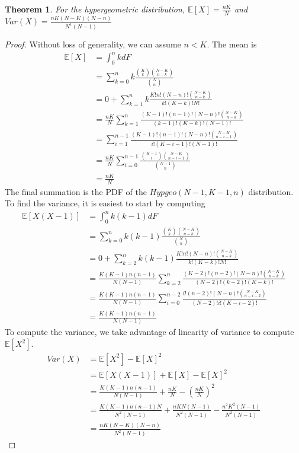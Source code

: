 \documentclass{article}
\newtheorem{theorem}{Theorem}
\theoremstyle{definition}\newtheorem{definition}{DEF}
\theoremstyle{definition}\newtheorem{example}{Ex}
\theoremstyle{lemma}\newtheorem{lemma}{Lemma}
\theoremstyle{corrolary}\newtheorem{corrolary}{Cor}
\begin{document}
\begin{theorem}
For the hypergeometric distribution, $\mathbb{E}[X]=\frac{nK}{N}$ and $Var(X)=\frac{nK(N-K)(N-n)}{N^1(N-1)}$
\end{theorem}
\begin{proof}
Without loss of generality, we can assume $n<K$.
The mean is
\begin{align*}
\mathbb{E}[X]&=\int_0^n kdF\\
&=\sum_{k=0}^n k\frac{\binom{K}{k}\binom{N-K}{n-k}}{\binom{N}{n}}\\
&=0+\sum_{k=1}^n k\frac{K!n!(N-n)!\binom{N-K}{n-k}}{k!(K-k)!N!}\\
&=\frac{nK}{N}\sum_{k=1}^n \frac{(K-1)!(n-1)!(N-n)!\binom{N-K}{n-k}}{(k-1)!(K-k)!(N-1)!}\\
&=\sum_{i=1}^{n-1} \frac{(K-1)!(n-1)!(N-n)!\binom{N-K}{n-i-1}}{i!(K-i-1)!(N-1)!}\\
&=\frac{nK}{N}\sum_{i=0}^{n-1}\frac{\binom{K-1}{i}\binom{N-K}{n-i-1}}{\binom{N-1}{n}}\\
&=\frac{nK}{N}
\end{align*}
The final summation is the PDF of the $Hypgeo(N-1,K-1,n)$ distribution.\\
To find the variance, it is easiest to start by computing
\begin{align*}
\mathbb{E}[X(X-1)]&=\int_0^nk(k-1)dF\\
&=\sum_{k=0}^n k(k-1)\frac{\binom{K}{k}\binom{N-K}{n-k}}{\binom{N}{n}}\\
&=0+\sum_{k=2}^n k(k-1)\frac{K!n!(N-n)!\binom{N-K}{n-k}}{k!(K-k)!N!}\\
&=\frac{K(K-1)n(n-1)}{N(N-1)}\sum_{k=2}^n\frac{(K-2)!(n-2)!(N-n)!\binom{N-K}{n-k}}{(N-2)!(k-2)!(K-k)!}\\
&=\frac{K(K-1)n(n-1)}{N(N-1)}\sum_{i=0}^{n-2} \frac{i!(n-2)!(N-n)!\binom{N-K}{n-i-2}}{(N-2)!i!(K-i-2)!}\\
&=\frac{K(K-1)n(n-1)}{N(N-1)}
\end{align*}
To compute the variance, we take advantage of linearity of variance to compute $\mathbb{E}[X^2]$.
\begin{align*}
Var(X)&=\mathbb{E}[X^2]-\mathbb{E}[X]^2\\
&=\mathbb{E}[X(X-1)]+\mathbb{E}[X]-\mathbb{E}[X]^2\\
&=\frac{K(K-1)n(n-1)}{N(N-1)}+\frac{nK}{N}-\left(\frac{nK}{N}\right)^2\\
&=\frac{K(K-1)n(n-1)N}{N^2(N-1)}+\frac{nKN(N-1)}{N^2(N-1)}-\frac{n^2K^2(N-1)}{N^2(N-1)}\\
&=\frac{nK(N-K)(N-n)}{N^2(N-1)}
\end{align*}
\end{proof}
\end{document}
